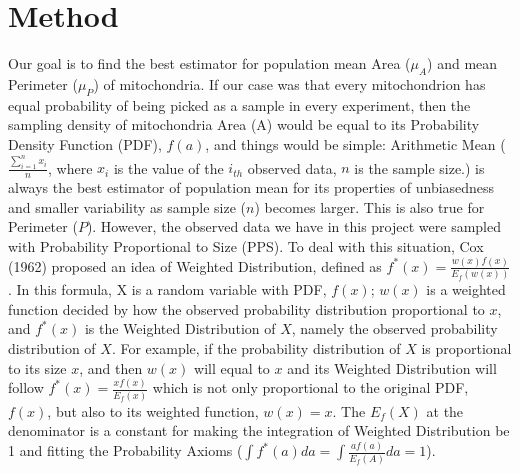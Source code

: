 \documentclass{article}\usepackage[]{graphicx}\usepackage[]{color}
\numberwithin{figure}{subsection} %
\numberwithin{table}{subsection} %
\begin{document}
\setcounter{section}{3}
\setcounter{page}{14}

\section{Method}

Our goal is to find the best estimator for population mean Area (${\mu}_{A}$) and mean Perimeter (${\mu}_{P}$) of mitochondria. If our case was that every mitochondrion has equal probability of being picked as a sample in every experiment, then the sampling density of mitochondria Area (A) would be equal to its Probability Density Function (PDF), $f(a)$, and things would be simple: Arithmetic Mean ($\frac{\sum_{i=1}^{n}{x}_{i}}{n}$, where ${x}_{i}$ is the value of the ${i}_{th}$ observed data, $n$ is the sample size.) is always the best estimator of population mean for its properties of unbiasedness and  smaller variability as sample size ($n$) becomes larger. This is also true for Perimeter ($P$). However, the observed data we have in this project were sampled with Probability Proportional to Size (PPS). To deal with this situation, Cox (1962) proposed an idea of Weighted Distribution, defined as ${f}^{\ast}(x)=\frac{w(x)f(x)}{{E}_{f}(w(x))}$. In this formula, X is a random variable with PDF, $f(x)$; $w(x)$ is a weighted function decided by how the observed probability distribution proportional to $x$, and ${f}^{\ast}(x)$ is the Weighted Distribution of $X$, namely the observed probability distribution of $X$. For example, if the probability distribution of $X$ is proportional to its size $x$, and then $w(x)$ will equal to $x$ and its Weighted Distribution will follow ${f}^{\ast}(x)=\frac{xf(x)}{{E}_{f}(x)}$ which is not only proportional to the original PDF, $f(x)$, but also to its weighted function, $w(x)=x$. The ${E}_{f}(X)$ at the denominator is a constant for making the integration of Weighted Distribution be 1 and fitting the Probability Axioms    ($\int {f}^{\ast}(a) da=\int \frac{af(a)}{{E}_{f}(A)}da=1$). 
\end{document}
